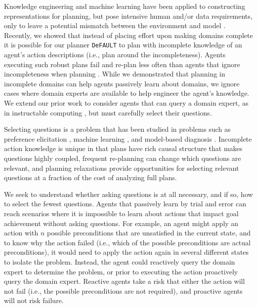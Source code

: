 \documentclass[letterpaper]{article}
\def\citep#1{\cite{#1}}
\def\default{{\tt DeFAULT}}
\begin{document}
Knowledge engineering \citep{ickeps09} and machine learning
\citep{arms,DBLP:conf/aaai/OatesC96} have been applied to constructing
representations for planning, but pose intensive human and/or data requirements,
only to leave a potential mismatch between the environment and model
\citep{modellite}.  Recently, we \cite{bryce-icaps11} showed that instead of
placing effort upon making domains complete it is possible for our planner
\default{} to plan with incomplete knowledge of an agent's action descriptions
(i.e., plan around the incompleteness).  Agents executing such robust plans fail and re-plan less often
 than agents that ignore
incompleteness when planning \citep{DBLP:conf/aips/ChangA06}.  While
we demonstrated that planning in incomplete domains can
help agents passively learn about domains, we ignore cases where domain
experts are available to help engineer the agent's knowledge.  We extend our
prior work \citep{bryce-icaps11} to
consider agents that can query a domain expert, as in instructable computing
\citep{mable}, but must carefully select their questions.

Selecting questions is a problem that has been studied in problems such as
preference elicitation \citep{DBLP:conf/aaai/Boutilier02}, machine learning
\citep{AICPub1812:2011}, and model-based diagnosis
\citep{deKleer:1992:CDS:140524.140531}.  
Incomplete action knowledge is unique in that plans have rich causal structure
that makes questions highly coupled, frequent re-planning can change which
questions are relevant, and planning relaxations provide opportunities for
selecting relevant questions at a fraction of the cost of analyzing full plans.  


We seek to understand whether asking questions is at all necessary, and if so,
how to select the fewest questions.  Agents that passively learn by trial and
error can reach scenarios where it is impossible to learn about actions that impact goal
achievement without asking questions. For example, an agent might apply an
action with $n$ possible preconditions that are unsatisfied in the current
state, and to know why the action failed (i.e., which of the possible
preconditions are actual preconditions), it would need to apply the action again in 
several different states to isolate the problem.  Instead, the agent could
reactively query the domain expert to determine the problem, or prior to
executing the action proactively query the domain expert.  Reactive agents take
a risk that either the action will not fail (i.e., the possible preconditions
are not required), and proactive agents will not risk failure.  
\end{document}
